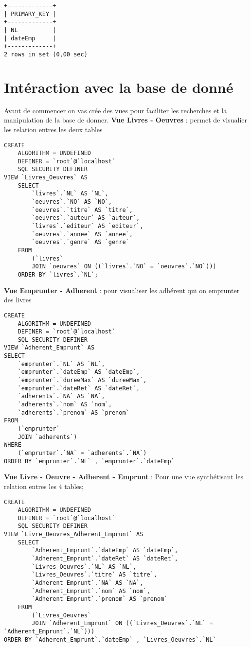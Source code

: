 \documentclass[11]{article}
\begin{document}
\begin{verbatim}
+-------------+
| PRIMARY_KEY |
+-------------+
| NL          |
| dateEmp     |
+-------------+
2 rows in set (0,00 sec)
\end{verbatim}

\newpage
\section{Intéraction avec la base de donné}

Avant de commencer on vas crée des vues pour faciliter les recherches et la manipulation de la base de donner.
\textbf{Vue Livres - Oeuvres} : permet de visualier les relation entres les deux tables
\begin{verbatim}
CREATE 
	ALGORITHM = UNDEFINED 
	DEFINER = `root`@`localhost` 
	SQL SECURITY DEFINER
VIEW `Livres_Oeuvres` AS
	SELECT 
		`livres`.`NL` AS `NL`,
		`oeuvres`.`NO` AS `NO`,
		`oeuvres`.`titre` AS `titre`,
		`oeuvres`.`auteur` AS `auteur`,
		`livres`.`editeur` AS `editeur`,
		`oeuvres`.`annee` AS `annee`,
		`oeuvres`.`genre` AS `genre`
	FROM
		(`livres`
		JOIN `oeuvres` ON ((`livres`.`NO` = `oeuvres`.`NO`)))
	ORDER BY `livres`.`NL`;
\end{verbatim}
\textbf{Vue Emprunter - Adherent } : pour visualiser les adhérent qui on emprunter des livres
\begin{verbatim}
CREATE 
    ALGORITHM = UNDEFINED 
    DEFINER = `root`@`localhost` 
    SQL SECURITY DEFINER
VIEW `Adherent_Emprunt` AS
SELECT 
    `emprunter`.`NL` AS `NL`,
    `emprunter`.`dateEmp` AS `dateEmp`,
    `emprunter`.`dureeMax` AS `dureeMax`,
    `emprunter`.`dateRet` AS `dateRet`,
    `adherents`.`NA` AS `NA`,
    `adherents`.`nom` AS `nom`,
    `adherents`.`prenom` AS `prenom`
FROM
    (`emprunter`
    JOIN `adherents`)
WHERE
    (`emprunter`.`NA` = `adherents`.`NA`)
ORDER BY `emprunter`.`NL` , `emprunter`.`dateEmp`
\end{verbatim}

\textbf{Vue Livre - Oeuvre - Adherent - Emprunt }: Pour une vue synthétisant les relation entres les 4  tables;
\begin{verbatim}
CREATE 
    ALGORITHM = UNDEFINED 
    DEFINER = `root`@`localhost` 
    SQL SECURITY DEFINER
VIEW `Livre_Oeuvres_Adherent_Emprunt` AS
    SELECT 
        `Adherent_Emprunt`.`dateEmp` AS `dateEmp`,
        `Adherent_Emprunt`.`dateRet` AS `dateRet`,
        `Livres_Oeuvres`.`NL` AS `NL`,
        `Livres_Oeuvres`.`titre` AS `titre`,
		`Adherent_Emprunt`.`NA` AS `NA`,
        `Adherent_Emprunt`.`nom` AS `nom`,
        `Adherent_Emprunt`.`prenom` AS `prenom`
    FROM
        (`Livres_Oeuvres`
        JOIN `Adherent_Emprunt` ON ((`Livres_Oeuvres`.`NL` = `Adherent_Emprunt`.`NL`)))
ORDER BY `Adherent_Emprunt`.`dateEmp` , `Livres_Oeuvres`.`NL`
\end{verbatim}
\end{document}
